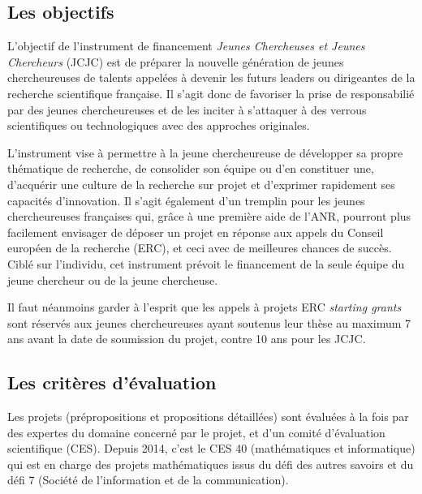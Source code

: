 
\subsection*{Les objectifs}

L'objectif de l'instrument de financement {\em Jeunes Chercheuses et Jeunes Chercheurs} (JCJC) est de pr\'eparer la nouvelle g\'en\'eration de jeunes chercheur\mp euse\mp s de talents appel\'e\mp e\mp s \`a devenir les futurs leaders ou dirigeant\mp e\mp s de la recherche scientifique fran\c{c}aise. Il s'agit donc de favoriser la prise de responsabili\'e par des jeunes chercheur\mp euse\mp s et de les inciter \`a s'attaquer \`a des verrous scientifiques ou technologiques avec des approches originales.

L'instrument vise \`a permettre \`a la jeune chercheur\mp euse de d\'evelopper sa propre th\'ematique de recherche, de consolider son \'equipe ou d'en constituer une, d'acqu\'erir une culture de la recherche sur projet et d'exprimer rapidement ses capacit\'es d'innovation. Il s'agit \'egalement d'un tremplin pour les jeunes chercheur\mp euse\mp s fran\c{c}ais\mp e\mp s qui, gr\^ace \`a une premi\`ere aide de l'ANR, pourront plus facilement envisager de d\'eposer un projet en r\'eponse aux appels du Conseil europ\'een  de la recherche (ERC), et ceci avec de meilleures chances de succ\`es. Cibl\'e sur l'individu, cet instrument pr\'evoit le financement de la seule \'equipe du jeune chercheur ou de la jeune chercheuse.

Il faut n\'eanmoins garder \`a l'esprit que les appels \`a projets ERC \emph{starting grants} sont r\'eserv\'es aux jeunes chercheur\mp euse\mp s ayant soutenus leur th\`ese au maximum 7 ans avant la date de soumission du projet, contre 10 ans pour les JCJC.


\subsection*{Les crit\`eres d'\'evaluation}

Les projets (pr\'epropositions et propositions d\'etaill\'ees) sont \'evalu\'ees \`a la fois par des expert\mp e\mp s du domaine concern\'e par le projet, et d'un comit\'e d'\'evaluation scientifique (CES). Depuis 2014, c'est le CES 40 (math\'ematiques et informatique) qui est en charge des projets math\'ematiques issus du d\'efi des autres savoirs et du d\'efi 7 (Soci\'et\'e de l'information et de la communication).

